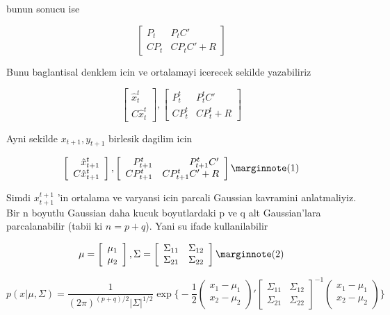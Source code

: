 \documentclass[12pt,fleqn]{article}\usepackage{../common}
\begin{document}
bunun sonucu ise

\[ 
\left[\begin{array}{rr}
P_t & P_t C' \\
CP_t & CP_tC' + R
\end{array}\right]
 \]

Bunu baglantisal denklem icin ve ortalamayi icerecek sekilde yazabiliriz

\[ 
\left[\begin{array}{r}
\hat{x}_t^t \\
C\hat{x}_t^t
\end{array}\right] 
, 
\left[\begin{array}{rr}
P_t^t & P_t^tC' \\
CP_t^t & CP_t^t + R
\end{array}\right]
 \]

Ayni sekilde $x_{t+1} , y_{t+1}$ birlesik dagilim icin

\[
\left[\begin{array}{r}
\hat{x}_{t+1}^t \\
C\hat{x}_{t+1}^t
\end{array}\right], 
\left[\begin{array}{rr}
P_{t+1}^t & P_{t+1}^tC' \\
CP_{t+1}^t & CP_{t+1}^tC' + R
\end{array}\right] 
\mlabel{1}
\]

Simdi $x_{t+1}^{t+1}$ 'in ortalama ve varyansi icin parcali Gaussian kavramini
anlatmaliyiz. Bir n boyutlu Gaussian daha kucuk boyutlardaki p ve q alt
Gaussian'lara parcalanabilir (tabii ki $n = p + q$). Yani su ifade
kullanilabilir

\[
\mu = 
\left[\begin{array}{r}
\mu_1 \\ \mu_2
\end{array}\right], 
\Sigma = 
\left[\begin{array}{rr}
\Sigma_{11} & \Sigma_{12} \\
\Sigma_{21} & \Sigma_{22} 
\end{array}\right]
\mlabel{2}
\]

\[ 
p(x|\mu,\Sigma) = 
\frac{1}{(2\pi)^{(p+q)/2}|\Sigma|^{1/2}}
\exp \bigg\{ 
-\frac{1}{2} 
\left(\begin{array}{rr}
x_1 - \mu_1 \\
x_2 - \mu_2 
\end{array}\right)'
\left[\begin{array}{rr}
\Sigma_{11} & \Sigma_{12} \\
\Sigma_{21} & \Sigma_{22} 
\end{array}\right]^{-1}
\left(\begin{array}{rr}
x_1 - \mu_1 \\
x_2 - \mu_2 
\end{array}\right)
\bigg\}
 \]
\end{document}
